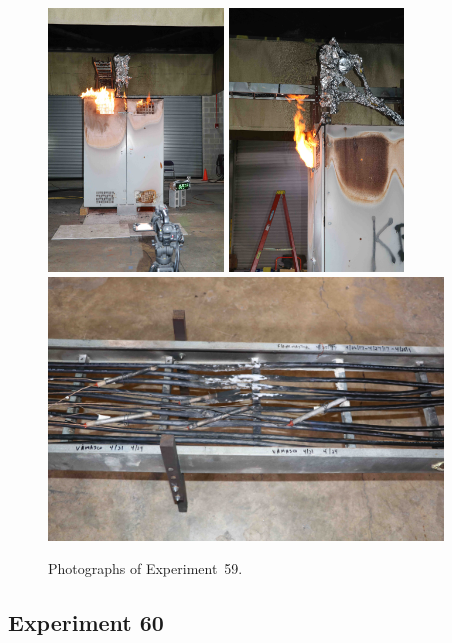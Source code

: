 \documentclass[12pt]{article}
\begin{document}
\begin{figure}[p]
\centering
\includegraphics[height=2.75in,angle=-90]{../FIGURES/Test_59_25_min_55_s}
\includegraphics[height=2.75in,angle=-90]{../FIGURES/Test_59_side} \\
\includegraphics[height=2.75in]{../FIGURES/Test_59_scar}
\caption[Photographs of Experiment~59]{Photographs of Experiment~59.}
\label{fig:Test_59_photos}
\end{figure}


\clearpage

\subsection{Experiment 60}
\end{document}
